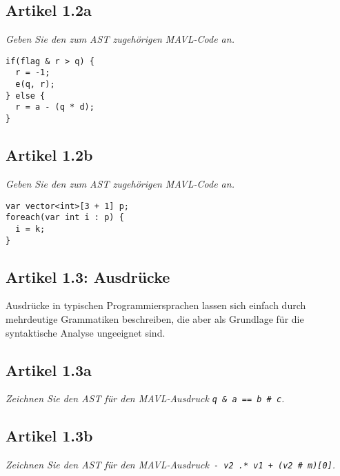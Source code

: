 \documentclass[
  ngerman,
  DIV=14
]{scrartcl}
\begin{document}
\subsection*{Artikel 1.2a}
\emph{Geben Sie den zum AST zugehörigen MAVL-Code an.}  

\bigskip\noindent
\begin{lstlisting}
if(flag & r > q) {
  r = -1;
  e(q, r);
} else {
  r = a - (q * d);
}
\end{lstlisting}


\subsection*{Artikel 1.2b}
\emph{Geben Sie den zum AST zugehörigen MAVL-Code an.}

\bigskip\noindent
\begin{lstlisting}
var vector<int>[3 + 1] p;
foreach(var int i : p) {
  i = k;
}  
\end{lstlisting}


\subsection*{Artikel 1.3: Ausdrücke}
Ausdrücke in typischen Programmiersprachen lassen sich einfach durch mehrdeutige Grammatiken beschreiben, die aber als Grundlage für die syntaktische Analyse ungeeignet sind.

\subsection*{Artikel 1.3a}
\emph{Zeichnen Sie den AST für den MAVL-Ausdruck \texttt{q \& a == b \# c}.}


\bigskip\noindent
{}


\subsection*{Artikel 1.3b}
\emph{Zeichnen Sie den AST für den MAVL-Ausdruck\texttt{ - v2 .* v1 + (v2 \# m)[0]}.}


\bigskip\noindent
{}
\end{document}
